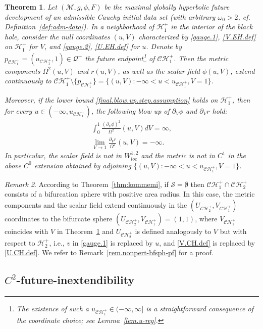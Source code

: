 \documentclass[10pt, reqno]{amsart}
\newtheorem{theorem}{Theorem}[section]
\theoremstyle{definition}
\theoremstyle{remark}
\newtheorem{remark}[theorem]{Remark}
\numberwithin{equation}{section}
\newcommand{\set}[1]{\{#1\}}
\newcommand{\rd}{\partial}
\newcommand{\0}{\emptyset}
\newcommand{\omg}{\omega}
\newcommand{\Omg}{\Omega}
\newcommand{\calC}{\mathcal C}
\newcommand{\calH}{\mathcal H}
\newcommand{\calM}{\mathcal M}
\newcommand{\calQ}{\mathcal Q}
\newcommand{\calS}{\mathcal S}
\newcommand{\CH}{\calC \calH^{+}}		%
\newcommand{\EH}{\calH^{+}}
\begin{document}
\begin{theorem} \label{thm.nonpert}
Let $(\calM, g, \phi, F)$ be the maximal globally hyperbolic future development of an admissible Cauchy initial data set (with arbitrary $\omg_{0}>2$, cf. Definition~\ref{def:adm-data}). In a neighborhood of $\EH_1$ in the interior of the black hole, consider the null coordinates $(u, V)$ characterized by \eqref{gauge.1}, \eqref{V.EH.def} on $\EH_{1}$ for $V$, and \eqref{gauge.2}, \eqref{U.EH.def} for $u$. Denote by $p_{\CH_{1}} = (u_{\CH_{1}}, 1) \in \calQ^{+}$ the future endpoint\footnote{The existence of such a  $u_{\CH_{1}} \in (-\infty, \infty]$ is a straightforward consequence of the coordinate choice; see Lemma~\ref{lem.u-reg}.} of $\CH_{1}$. Then the metric components $\Omg^{2}(u, V)$ and $r(u, V)$, as well as the scalar field $\phi(u, V)$, extend continuously to $\CH_{1} \setminus \set{p_{\CH_{1}}} = \set{(u, V) : -\infty < u < u_{\CH_{1}}, V = 1}$.

Moreover, if the lower bound \eqref{final.blow.up.step.assumption} holds on $\EH_{1}$, then for every $u \in (-\infty, u_{\CH_{1}})$, the following blow up of $\rd_{V} \phi$ and $\rd_{V} r$ hold:
\begin{align} 
	\int_{0}^{1} \frac{(\rd_{V} \phi)^{2}}{\Omg^{2}}(u, V) d V = \infty, \label{eq:nonpert-blowup-phi} \\
	\lim_{V \to 1} \frac{\rd_{V} r}{\Omg^{2}}(u, V) = - \infty.		\label{eq:nonpert-blowup-dvr}
\end{align}
In particular, the scalar field is not in $W^{1,2}_{loc}$ and the metric is not in $C^1$ in the above $C^0$ extension obtained by adjoining $\set{(u, V) : -\infty < u < u_{\CH_{1}}, V = 1}$.
\end{theorem}
\begin{remark} \label{rem.nonpert-bfsph}
According to Theorem~\ref{thm:kommemi}, if $\calS = \emptyset$ then $\CH_{1} \cap \CH_{2}$ consists of a bifurcation sphere with positive area radius. In this case, the metric components and the scalar field extend continuously in the $(U_{\CH_{2}}, V_{\CH_{1}})$ coordinates to the bifurcate sphere $(U_{\CH_{2}}, V_{\CH_{1}}) = (1, 1)$, where $V_{\CH_{1}}$ coincides with $V$ in Theorem~\ref{thm.nonpert} and $U_{\CH_{2}}$ is defined analogously to $V$ but with respect to $\EH_{2}$, i.e., $v$ in \eqref{gauge.1} is replaced by $u$, and \eqref{V.CH.def} is replaced by \eqref{U.CH.def}. We refer to Remark~\ref{rem.nonpert-bfsph-pf} for a proof.
\end{remark}

\subsection{$C^2$-future-inextendibility}
\end{document}
